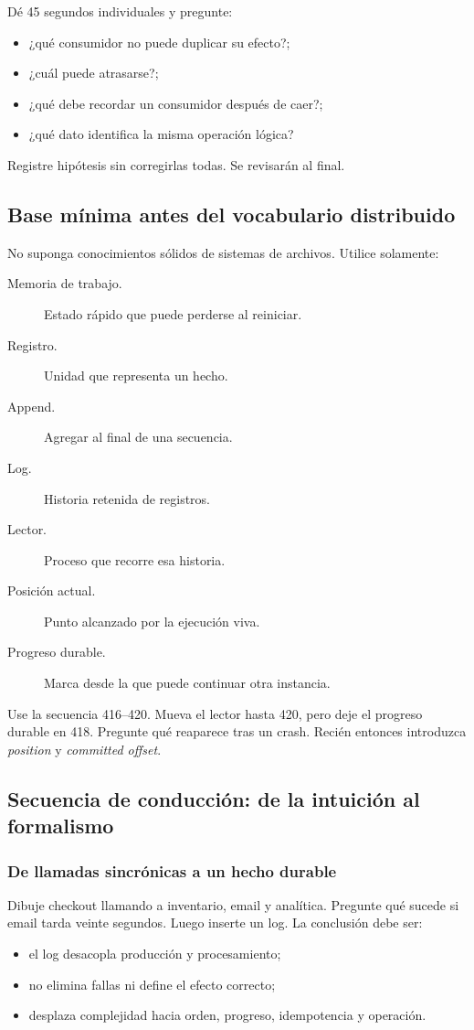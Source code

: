 \documentclass[variant=docente,cover=institutional,mode=screen]{ua-engineering-v6-article}
\begin{document}
Dé 45 segundos individuales y pregunte:
\begin{itemize}
\item ¿qué consumidor no puede duplicar su efecto?;
\item ¿cuál puede atrasarse?;
\item ¿qué debe recordar un consumidor después de caer?;
\item ¿qué dato identifica la misma operación lógica?
\end{itemize}

Registre hipótesis sin corregirlas todas. Se revisarán al final.

\subsection{Base mínima antes del vocabulario distribuido}

No suponga conocimientos sólidos de sistemas de archivos. Utilice solamente:
\begin{description}
\item[Memoria de trabajo.] Estado rápido que puede perderse al reiniciar.
\item[Registro.] Unidad que representa un hecho.
\item[Append.] Agregar al final de una secuencia.
\item[Log.] Historia retenida de registros.
\item[Lector.] Proceso que recorre esa historia.
\item[Posición actual.] Punto alcanzado por la ejecución viva.
\item[Progreso durable.] Marca desde la que puede continuar otra instancia.
\end{description}

Use la secuencia 416--420. Mueva el lector hasta 420, pero deje el progreso durable en 418. Pregunte qué reaparece tras un crash. Recién entonces introduzca \emph{position} y \emph{committed offset}.

\subsection{Secuencia de conducción: de la intuición al formalismo}

\subsubsection{De llamadas sincrónicas a un hecho durable}
Dibuje checkout llamando a inventario, email y analítica. Pregunte qué sucede si email tarda veinte segundos. Luego inserte un log. La conclusión debe ser:
\begin{itemize}
\item el log desacopla producción y procesamiento;
\item no elimina fallas ni define el efecto correcto;
\item desplaza complejidad hacia orden, progreso, idempotencia y operación.
\end{itemize}
\end{document}
